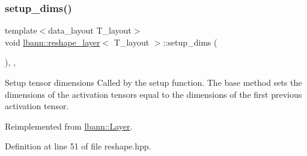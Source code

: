 \subsubsection{\texorpdfstring{setup\+\_\+dims()}{setup\_dims()}}
{\footnotesize\ttfamily template$<$data\+\_\+layout T\+\_\+layout$>$ \\
void \hyperlink{classlbann_1_1reshape__layer}{lbann\+::reshape\+\_\+layer}$<$ T\+\_\+layout $>$\+::setup\+\_\+dims (\begin{DoxyParamCaption}{ }\end{DoxyParamCaption})\hspace{0.3cm}{\ttfamily [inline]}, {\ttfamily [override]}, {\ttfamily [virtual]}}

Setup tensor dimensions Called by the setup function. The base method sets the dimensions of the activation tensors equal to the dimensions of the first previous activation tensor. 

Reimplemented from \hyperlink{classlbann_1_1Layer_a90fce1b06c1f2abb480e18cfe08a9746}{lbann\+::\+Layer}.



Definition at line 51 of file reshape.\+hpp.


